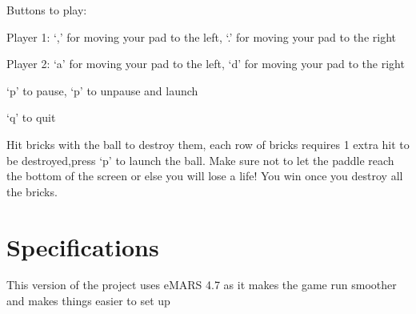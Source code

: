 \documentclass[11pt]{article}
\begin{document}
Buttons to play: 

Player 1: `,' for moving your pad to the left, `.' for moving your pad to the right

Player 2: `a' for moving your pad to the left, `d' for moving your pad to the right

`p' to pause, `p' to unpause and launch

`q' to quit

Hit bricks with the ball to destroy them, each row of bricks requires 1 extra hit to be destroyed,press `p' to launch the ball. Make sure not to let the paddle reach the bottom of the screen or else you will lose a life! You win once you destroy all the bricks.

\section{Specifications}

This version of the project uses eMARS 4.7 as it makes the game run smoother and makes things easier to set up
\end{document}
